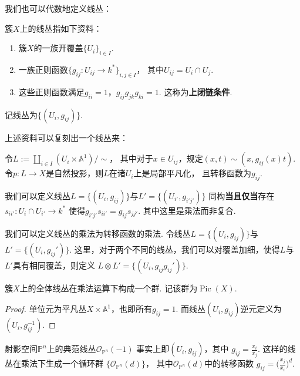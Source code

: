     我们也可以代数地定义线丛：
    \begin{definition}[线丛2]
        簇$X$上的线丛指如下资料：
        \begin{enumerate}
            \item[(1)] 簇$X$的一族开覆盖$\{U_{i}\}_{i \in I}$.
            \item[(2)] 一族正则函数$\{g_{ij}\colon U_{ij} \rightarrow k^{*}\}_{i,j \in I}$，
                       其中$U_{ij}=U_{i} \cap U_{j}$.
            \item[(3)] 这些正则函数满足$g_{ii}=1$，$g_{ij}g_{jk}g_{ki}=1$. 
                       这称为\textbf{上闭链条件}.
        \end{enumerate}
        记线丛为$\{(U_{i},g_{ij})\}$.
    \end{definition}

    \begin{remark}
        上述资料可以复刻出一个线丛来：\par
        令$L:=\coprod_{i \in I}(U_{i} \times \mathbb{A}^{1})/\sim$，
        其中对于$x \in U_{ij}$，规定$(x,t) \sim (x,g_{ij}(x)t)$. 
        令$p\colon L \rightarrow X$是自然投影，则$L$在诸$U_{i}$上是局部平凡化，
        且转移函数为$g_{ij}$.
    \end{remark}

    \begin{remark}
        我们可以定义线丛$L=\{(U_{i},g_{ij})\}$与$L'=\{(U_{i'},g_{i'j'})\}$
        同构\textbf{当且仅当}存在
        $s_{ii'}\colon U_{i} \cap U_{i'} \rightarrow k^{*}$
        使得$g_{i'j'}s_{ii'}=g_{ij}s_{jj'}$. 其中这里是乘法而非复合.
    \end{remark}

    我们可以定义线丛的乘法为转移函数的乘法. 
    令线丛$L=\{(U_{i},g_{ij})\}$与$L'=\{(U_{i},g_{ij}')\}$. 
    这里，对于两个不同的线丛，我们可以对覆盖加细，使得$L$与$L'$具有相同覆盖，则定义
    $L \otimes L'=\{(U_{i},g_{ij}g_{ij}')\}$. 

    \begin{proposition}[Picard群]
        簇$X$上的全体线丛在乘法运算下构成一个群. 记该群为$\operatorname{Pic}(X)$.
    \end{proposition}
    \begin{proof}
        单位元为平凡丛$X \times \mathbb{A}^{1}$，也即所有$g_{ij}=1$.
        而线丛$(U_{i},g_{ij})$逆元定义为$(U_{i},g_{ij}^{-1})$.
    \end{proof}

    \begin{example}
        射影空间$\mathbb{P}^{n}$上的典范线丛$\mathcal{O}_{\mathbb{P}^{n}}(-1)$
        事实上即$(U_{i},g_{ij})$，其中
        $g_{ij}=\frac{x_{i}}{x_{j}}$. 这样的线丛在乘法下生成一个循环群
        $\{\mathcal{O}_{\mathbb{P}^{n}}(d)\}$，
        其中$\mathcal{O}_{\mathbb{P}^{n}}(d)$中的转移函数
        $g_{ij}=\big(\frac{x_{j}}{x_{i}}\big)^{d}$.
    \end{example}

